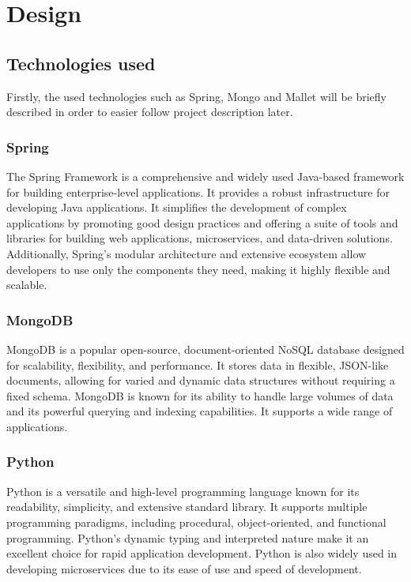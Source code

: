 \section{Design}

\label{ch:design}

\subsection{Technologies used}
Firstly, the used technologies such as Spring, Mongo and Mallet will be briefly described in order
to easier follow project description later.
\subsubsection{Spring}
The Spring Framework is a comprehensive and widely used Java-based framework for building
enterprise-level applications. It provides a robust infrastructure for developing Java applications.
It simplifies the development of complex applications by promoting good design practices and
offering a suite of tools and libraries for building web applications, microservices, and
data-driven solutions. Additionally, Spring's modular architecture and extensive ecosystem
allow developers to use only the components they need, making it highly flexible and scalable.
\cite{spring}

\subsubsection{MongoDB}
MongoDB is a popular open-source, document-oriented NoSQL database designed for scalability,
flexibility, and performance. It stores data in flexible, JSON-like documents, allowing for varied
and dynamic data structures without requiring a fixed schema. MongoDB is known for its ability to handle large
volumes of data and its powerful querying and indexing capabilities. It supports a wide range of applications.
\cite{mongodb}

\subsubsection{Python}
Python is a versatile and high-level programming language known for its readability, simplicity, and extensive
standard library. It supports multiple programming paradigms, including procedural, object-oriented, and
functional programming. Python's dynamic typing and interpreted nature make it an excellent choice for rapid
application development. Python is also widely used in developing microservices due to its ease of use and
speed of development. \cite{python}

